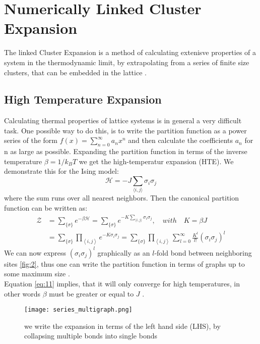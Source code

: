\documentclass{article}
\begin{document}
\section{Numerically Linked Cluster Expansion}
The linked Cluster Expansion is a method of calculating extenisve properties of
a system in the thermodynamic limit, by extrapolating
from a series of finite size clusters, that can be embedded in the
lattice \cite{Rigol,Series,Domb}.\\
\subsection{High Temperature Expansion}

Calculating thermal properties of lattice systems is in general a
very difficult task. One possible way to do this, is to write the
partition function as a power series of the form $f(x) =
\sum_{n=0}^{\infty} a_nx^n$ and then calculate the coefficients $a_n$
for n as large as possible. Expanding the partition function in terms
of the inverse temperature $\beta =
1/k_BT$ we get the high-temperatur expansion (HTE).
We demonstrate this for the Ising model:
\begin{equation}
\label{eq:10}
\mathcal{H} = -J \sum\limits_{\langle i,j \rangle} \sigma_i \sigma_j
\end{equation}
where the sum runs over all nearest neighbors. Then the canonical
partition function can be written as:
\begin{align}
\label{eq:11}
\mathcal{Z} &= \sum\limits_{\{ \sigma \}} e^{-\beta \mathcal{H}} =
\sum\limits_{\{ \sigma \}} e^{-K \sum_{\langle i,j \rangle}
  \sigma_i \sigma_j}, \quad with \quad K = \beta J\\
&= \sum\limits_{\{ \sigma \}} \prod\limits_{\left\langle i,j
  \right\rangle} e^{-K \sigma_i \sigma_j} =  \sum\limits_{\{ \sigma \}} \prod\limits_{\left\langle i,j
  \right\rangle} \sum\limits_{l = 0}^{\infty} \frac{K^l}{l!}(\sigma_i
  \sigma_j )^l
\end{align}
We can now express $(\sigma_i \sigma_j)^l$ graphically as an $l$-fold
bond between neighboring sites \eqref{fig:2}, thus one can write the partition
function in terms of graphs up to some maximum size
\cite{Rigol,Series}.\\
Equation \eqref{eq:11} implies, that it will only converge for high
temperatures, in other words $\beta$ must be greater or equal to $J$ \cite{Rigol}.\\ 

\begin{figure}[htbp]
\centerline{\texttt{[image: series\_multigraph.png]}}
\caption[]{\label{fig:2} we write the expansion in terms of the left
  hand side (LHS), by collapsing multiple bonds into single bonds}
\end{figure}
\end{document}
